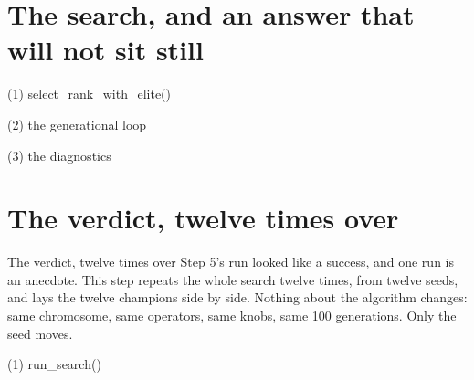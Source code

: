 \section{The search, and an answer that will not sit still}



\begin{frame}[fragile]{(1) select\_rank\_with\_elite()}

\end{frame}

\begin{frame}[fragile]{(2) the generational loop}

\end{frame}

\begin{frame}[fragile]{(3) the diagnostics}

\end{frame}


\section{The verdict, twelve times over}

\begin{frame}{The verdict, twelve times over}
Step 5's run looked like a success, and one run is an anecdote. This step
repeats the whole search twelve times, from twelve seeds, and lays the
twelve champions side by side. Nothing about the algorithm changes: same
chromosome, same operators, same knobs, same 100 generations. Only the seed
moves.
\end{frame}

\begin{frame}[fragile]{(1) run\_search()}

\end{frame}

